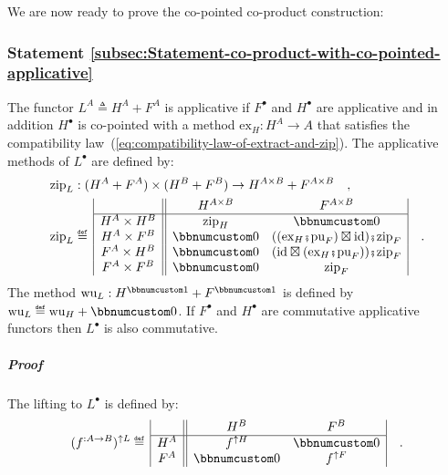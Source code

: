 We are now ready to prove the co-pointed co-product construction:

\subsubsection{Statement \label{subsec:Statement-co-product-with-co-pointed-applicative}\ref{subsec:Statement-co-product-with-co-pointed-applicative}}

The functor $L^{A}\triangleq H^{A}+F^{A}$ is applicative if $F^{\bullet}$
and $H^{\bullet}$ are applicative and in addition $H^{\bullet}$
is co-pointed with a method $\text{ex}_{H}:H^{A}\rightarrow A$ that
satisfies the compatibility law~(\ref{eq:compatibility-law-of-extract-and-zip}).
The applicative methods of $L^{\bullet}$ are defined by:
\begin{align*}
 & \text{zip}_{L}:(H^{A}+F^{A})\times(H^{B}+F^{B})\rightarrow H^{A\times B}+F^{A\times B}\quad,\\
 & \text{zip}_{L}\triangleq\,\begin{array}{|c||cc|}
 & H^{A\times B} & F^{A\times B}\\
\hline H^{A}\times H^{B} & \text{zip}_{H} & \bbnum 0\\
H^{A}\times F^{B} & \bbnum 0 & ((\text{ex}_{H}\bef\text{pu}_{F})\boxtimes\text{id})\bef\text{zip}_{F}\\
F^{A}\times H^{B} & \bbnum 0 & (\text{id}\boxtimes(\text{ex}_{H}\bef\text{pu}_{F}))\bef\text{zip}_{F}\\
F^{A}\times F^{B} & \bbnum 0 & \text{zip}_{F}
\end{array}\quad.
\end{align*}
The method $\text{wu}_{L}:H^{\bbnum 1}+F^{\bbnum 1}$ is defined by
$\text{wu}_{L}\triangleq\text{wu}_{H}+\bbnum 0$. If $F^{\bullet}$
and $H^{\bullet}$ are commutative applicative functors then $L^{\bullet}$
is also commutative.

\subparagraph{Proof}

The lifting to $L^{\bullet}$ is defined by:
\[
(f^{:A\rightarrow B})^{\uparrow L}\triangleq\,\begin{array}{|c||cc|}
 & H^{B} & F^{B}\\
\hline H^{A} & f^{\uparrow H} & \bbnum 0\\
F^{A} & \bbnum 0 & f^{\uparrow F}
\end{array}\quad.
\]

